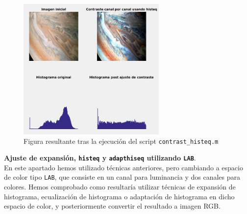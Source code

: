 \documentclass[12pt]{article}
\begin{document}
	\begin{figure}[h!]
		\begin{center}
			\includegraphics[width=0.65\textwidth]{img/contrast_histeq.png}
			\caption{Figura resultante tras la ejecución del script \texttt{contrast\_histeq.m}}
			\label{img: contrast histeq}
		\end{center}
	\end{figure}

	\noindent \textbf{\large Ajuste de expansión, \texttt{histeq} y \texttt{adapthiseq} utilizando \texttt{LAB}}. \\ 
	
	\noindent En este apartado hemos utilizado técnicas anteriores, pero cambiando a espacio de color tipo \texttt{LAB}, que consiste en un canal para luminancia y dos canales para colores. Hemos comprobado como resultaría utilizar técnicas de expansión de histograma, ecualización de histograma o adaptación de histograma en dicho espacio de color, y posteriormente convertir el resultado a imagen RGB.
	
\end{document}
